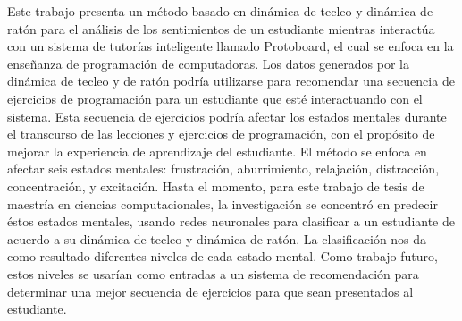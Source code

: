 % 
% 
%

Este trabajo presenta un método basado en dinámica de tecleo y dinámica de ratón para el análisis de los sentimientos de un estudiante mientras interactúa con un sistema de tutorías inteligente llamado Protoboard, el cual se enfoca en la enseñanza de programación de computadoras. Los datos generados por la dinámica de tecleo y de ratón podría utilizarse para recomendar una secuencia de ejercicios de programación para un estudiante que esté interactuando con el sistema. Esta secuencia de ejercicios podría afectar los estados mentales durante el transcurso de las lecciones y ejercicios de programación, con el propósito de mejorar la experiencia de aprendizaje del estudiante. El método se enfoca en afectar seis estados mentales: frustración, aburrimiento, relajación, distracción, concentración, y excitación. Hasta el momento, para este trabajo de tesis de maestría en ciencias computacionales, la investigación se concentró en predecir éstos estados mentales, usando redes neuronales para clasificar a un estudiante de acuerdo a su dinámica de tecleo y dinámica de ratón. La clasificación nos da como resultado diferentes niveles de cada estado mental. Como trabajo futuro, estos niveles se usarían como entradas a un sistema de recomendación para determinar una mejor secuencia de ejercicios para que sean presentados al estudiante.
